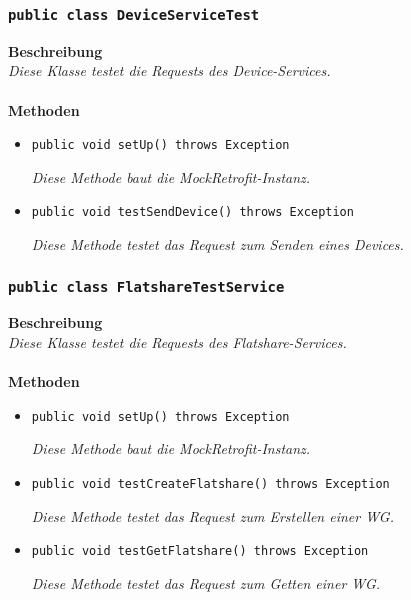 \documentclass[a4paper]{scrreprt}
\begin{document}
	\subsubsection{\texttt{public class DeviceServiceTest}}
	\textbf{Beschreibung}\\
	\textit{Diese Klasse testet die Requests des Device-Services.}\\
	\\
	\textbf{Methoden}
	\begin{itemize}
	
		\item\texttt{{public void setUp() throws Exception}}
	
	\textit{Diese Methode baut die MockRetrofit-Instanz.}
	
	\item\texttt{{public void testSendDevice() throws Exception}}
	
	\textit{Diese Methode testet das Request zum Senden eines Devices.}
	
	\end{itemize}
	
	\subsubsection{\texttt{public class FlatshareTestService}}
	\textbf{Beschreibung}\\
	\textit{Diese Klasse testet die Requests des Flatshare-Services.}\\
	\\
	\textbf{Methoden}
	\begin{itemize}
		
		
		\item\texttt{{public void setUp() throws Exception}}
		
		\textit{Diese Methode baut die MockRetrofit-Instanz.}
		
		\item\texttt{{public void testCreateFlatshare() throws Exception}}
		
		\textit{Diese Methode testet das Request zum Erstellen einer WG.}
		
		\item\texttt{{public void testGetFlatshare() throws Exception}}
		
		\textit{Diese Methode testet das Request zum Getten einer WG.}
		
	\end{itemize}
\end{document}
